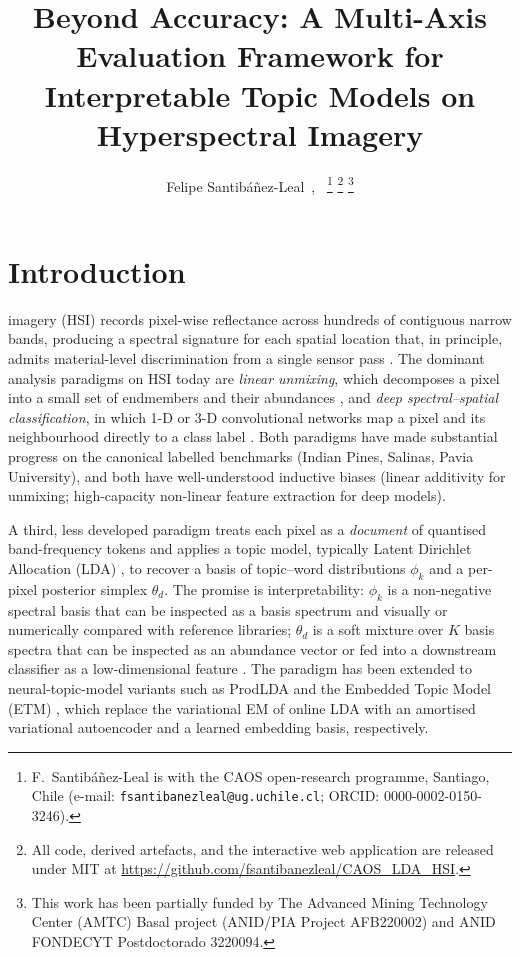 \documentclass[journal,a4paper,10pt]{IEEEtran}
\title{Beyond Accuracy: A Multi-Axis Evaluation Framework for
Interpretable Topic Models on Hyperspectral Imagery}
\author{%
  Felipe Santib\'a\~nez-Leal~\orcidlink{0000-0002-0150-3246},~\IEEEmembership{Independent Researcher}%
  \thanks{F.\ Santib\'a\~nez-Leal is with the CAOS open-research
    programme, Santiago, Chile
    (e-mail: \texttt{fsantibanezleal@ug.uchile.cl};
    ORCID: 0000-0002-0150-3246).}%
  \thanks{All code, derived artefacts, and the interactive web
    application are released under MIT at
    \url{https://github.com/fsantibanezleal/CAOS_LDA_HSI}.}%
  \thanks{This work has been partially funded by The Advanced Mining
    Technology Center (AMTC) Basal project (ANID/PIA Project AFB220002)
    and ANID FONDECYT Postdoctorado 3220094.}%
}
\begin{document}

\maketitle
\IEEEdisplaynotcompsoctitleabstractindextext
\IEEEpeerreviewmaketitle

\section{Introduction}
\label{sec:intro}

 imagery (HSI) records pixel-wise
reflectance across hundreds of contiguous narrow bands, producing a
spectral signature for each spatial location that, in principle,
admits material-level discrimination from a single sensor pass
\cite{plaza2009recent,camps2014advances}. The dominant analysis
paradigms on HSI today are \emph{linear unmixing}, which decomposes a
pixel into a small set of endmembers and their abundances
\cite{nascimento2005vca,bioucasdias2012unmixing}, and \emph{deep
spectral--spatial classification}, in which \mbox{1-D} or \mbox{3-D} convolutional
networks map a pixel and its neighbourhood directly to a class
label \cite{chen2014deep,paoletti2019deep}. Both paradigms have made
substantial progress on the canonical labelled benchmarks (Indian
Pines, Salinas, Pavia University), and both have well-understood
inductive biases (linear additivity for unmixing; high-capacity
non-linear feature extraction for deep models).

A third, less developed paradigm treats each pixel as a
\emph{document} of quantised band-frequency tokens and applies a topic
model, typically Latent Dirichlet Allocation (LDA)
\cite{blei2003lda,hoffman2010online}, to recover a basis of
topic--word distributions $\phi_k$ and a per-pixel posterior simplex
$\theta_d$. The promise is interpretability: $\phi_k$ is a non-negative
spectral basis that can be inspected as a basis spectrum and visually
or numerically compared with reference libraries; $\theta_d$ is a
soft mixture over $K$ basis spectra that can be inspected as an
abundance vector or fed into a downstream classifier as a low-dimensional
feature \cite{zou2017pmlda}. The paradigm has been
extended to neural-topic-model variants such as ProdLDA
\cite{srivastava2017autoencoding} and the Embedded Topic Model (ETM)
\cite{dieng2020topic}, which replace the variational EM of online LDA
with an amortised variational autoencoder
\cite{kingma2014auto,miao2016neural} and a learned embedding basis,
respectively.
\end{document}
